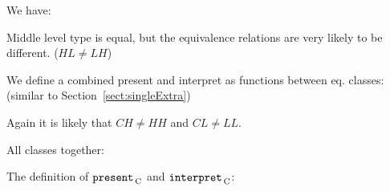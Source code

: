 We have: 


Middle level type is equal, but the equivalence relations are very likely to be different. ($HL \neq LH$)

We define a combined present and interpret as functions between eq. classes: (similar to Section~\ref{sect:singleExtra})


Again it is likely that  $CH \neq HH$ and $CL \neq LL$.

All classes together:



%
The definition of ${\tt present}_{\, \mathrm C}$ and ${\tt interpret}_{\, \mathrm C}$: 

